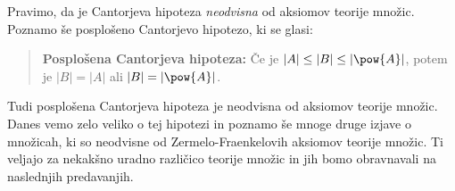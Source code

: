 Pravimo, da je Cantorjeva hipoteza \emph{neodvisna} od aksiomov teorije množic. Poznamo še posplošeno Cantorjevo hipotezo, ki se glasi:
%
\begin{quote}
  \textbf{Posplošena Cantorjeva hipoteza:}
  Če je $|A| \leq |B| \leq |\pow{A}|$, potem je $|B| = |A|$ ali $|B| = |\pow{A}|$.
\end{quote}
%
Tudi posplošena Cantorjeva hipoteza je neodvisna od aksiomov teorije množic.
Danes vemo zelo veliko o tej hipotezi in poznamo še mnoge druge izjave o množicah, ki so neodvisne od Zermelo-Fraenkelovih aksiomov teorije množic.
Ti veljajo za nekakšno uradno različico teorije množic in jih bomo obravnavali na naslednjih predavanjih.



